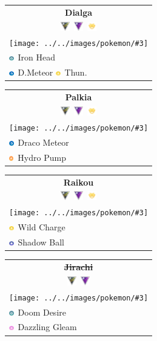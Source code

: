 \documentclass[12pt]{beamer}
\newcommand{\dragonsimp}{\includegraphics[height=0.2cm]{../../images/type/simplified/dragon.png}}
\newcommand{\ghostsimp}{\includegraphics[height=0.2cm]{../../images/type/simplified/ghost.png}}
\newcommand{\electricsimp}{\includegraphics[height=0.2cm]{../../images/type/simplified/electric.png}}
\newcommand{\firesimp}{\includegraphics[height=0.2cm]{../../images/type/simplified/fire.png}}
\newcommand{\steelsimp}{\includegraphics[height=0.2cm]{../../images/type/simplified/steel.png}}
\newcommand{\fairysimp}{\includegraphics[height=0.2cm]{../../images/type/simplified/fairy.png}}
\newcommand{\pokemon}[5]{
\begin{tabular}{p{2.7cm}}
\multicolumn{1}{c}{\textbf{#1}} \\
\multicolumn{1}{c}{#2} \\
\multicolumn{1}{c}{\texttt{[image: ../../images/pokemon/\#3]} } \\
#4 \\ #5 \\  
\end{tabular}
}
\newcommand{\ultraleague}{\includegraphics[width=0.4cm]{../../images/league/ultra_league.png}}
\newcommand{\masterleague}{\includegraphics[width=0.4cm]{../../images/league/master_league.png}}
\newcommand{\raids}{\includegraphics[width=0.4cm]{../../images/league/raids.png}}
\begin{document}
\begin{frame}
\begin{footnotesize}
\begin{block}{}
\begin{center}
\pokemon{Dialga}{\ultraleague~\masterleague~\raids}{dialga}{\steelsimp~Iron Head}{\dragonsimp~D.Meteor \electricsimp~Thun.}
\pokemon{Palkia}{\ultraleague~\masterleague~\raids}{palkia}{\dragonsimp~Draco Meteor}{\firesimp~Hydro Pump}
\pokemon{Raikou}{\ultraleague~\masterleague~\raids}{raikou}{\electricsimp~Wild Charge}{\ghostsimp~Shadow Ball}
\pokemon{\sout{Jirachi}}{\ultraleague~\masterleague}{jirachi}{\steelsimp~Doom Desire}{\fairysimp~Dazzling Gleam}





\end{center}
\end{block}

\end{footnotesize}
\end{frame}
\end{document}
